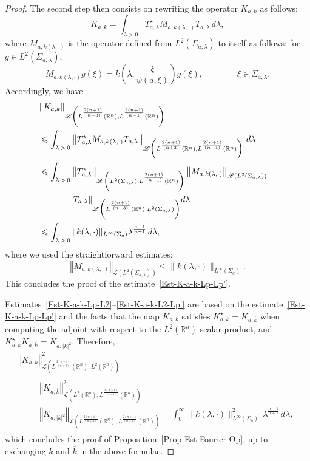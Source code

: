 \documentclass[10pt]{amsart}
\theoremstyle{definition}\newtheorem{defi}[theo]{Definition}\newtheorem{rema}[theo]{Remark}\newtheorem{exam}[theo]{Example}\newtheorem{exem}[theo]{Example}\newtheorem{nota}[theo]{Notation}
\newcommand{\scL}{\mathscr{L}}
\newcommand*\R{\mathbb{R}}
\newcommand{\norm}[1]{\left\Vert#1\right\Vert}
\renewcommand{\leq}{\leqslant}
\begin{document}
\begin{proof}
The second step then consists on rewriting the operator $K_{a,k}$ as follows:
\[
K_{a,k} = \int_{\lambda >0} T_{a,\lambda}^\star M_{a,k(\lambda, \cdot)} T_{a, \lambda} \, d\lambda,
\]
where $M_{a, k(\lambda, \cdot)}$ is the operator defined from $ L^2(\Sigma_{a, \lambda})$ to itself as follows: for $g \in L^2(\Sigma_{a,\lambda})$,
\[
M_{a, k(\lambda, \cdot)} g (\xi) = k\left(\lambda, \frac{\xi}{\psi(a, \xi)} \right) g(\xi), \qquad \qquad \xi \in \Sigma_{a,\lambda}.
\]
Accordingly, we have
\begingroup
\allowdisplaybreaks
\begin{align*}
\lefteqn{\norm{K_{a,k} }_{\scL\left(L^{\frac{2(n+1)}{(n+3)}}(\R^n),L^{\frac{2(n+1)}{(n-1)}}(\R^n)\right)} }
\\
& \leq
\int_{\lambda\, >\,0}
\norm{T_{a,\lambda}^\star M_{a,k(\lambda, \cdot)} T_{a, \lambda} }_{\scL\left(L^{\frac{2(n+1)}{(n+3)}}(\R^n),L^{\frac{2(n+1)}{(n-1)}}(\R^n)\right)}
\, d\lambda
\\
&\leq \int_{\lambda\, >\,0}
\norm{T_{a,\lambda}^\star}_{\scL\left(L^{2}(\Sigma_{a,\lambda}),L^{\frac{2(n+1)}{(n-1)}}(\R^n)\right)}
\norm{M_{a,k(\lambda, \cdot)} }_{\scL\left(L^{2}(\Sigma_{a,\lambda})\right)}\\
&\mkern60mu
\norm{T_{a, \lambda} }_{\scL\left(L^{\frac{2(n+1)}{(n+3)}}(\R^n),L^{2}(\Sigma_{a,\lambda})\right)}
\! d\lambda
\\
& \leq \int_{\lambda\,>\,0} \| k (\lambda, \cdot)\|_{L^\infty(\Sigma_a)} \lambda^{\frac{n-1}{n+1}} \, d\lambda,
\end{align*}
\endgroup
where we used the straightforward estimates:
\[
\norm{M_{a,k(\lambda, \cdot)} }_{\scL\left(L^{2}(\Sigma_{a,\lambda})\right)}
\leq
\| k(\lambda, \cdot) \|_{L^\infty(\Sigma_a)}.
\]
This concludes the proof of the estimate~\eqref{Est-K-a-k-Lp-Lp'}.

Estimates~\eqref{Est-K-a-k-Lp-L2}--\eqref{Est-K-a-k-L2-Lp'} are based on the estimate~\eqref{Est-K-a-k-Lp-Lp'} and the facts that the map $K_{a,k}$ satisfies $K_{a,k}^\star = K_{a,\overline{k}}$ when computing the adjoint with respect to the $L^2(\R^n)$ scalar product, and $K_{a,k}^\star K_{a,\overline k} = K_{a,|k|^2}$. Therefore,
\begin{multline*}
\norm{K_{a,k} }_{\scL\left(L^{\frac{2(n+1)}{(n+3)}}(\R^n),L^{2}(\R^n)\right)}^2\\
\begin{aligned}
&=
\norm{K_{a,\overline k} }_{\scL\left(L^{2}(\R^n),L^{\frac{2(n+1)}{(n-1)}}(\R^n)\right)}^2
\\
&=
\norm{K_{a,|k|^2} }_{\scL\left(L^{\frac{2(n+1)}{(n+3)}}(\R^n),L^{\frac{2(n+1)}{(n-1)}}(\R^n)\right)} =
\int_0^\infty \| k(\lambda, \cdot)\|_{L^\infty(\Sigma_a)}^2 \, \lambda^{\frac{n-1}{n+1}} \, d\lambda,
\end{aligned}
\end{multline*}
which concludes the proof of Proposition~\ref{Prop-Est-Fourier-Op}, up to exchanging $k$ and $\overline k$ in the above formulae.
\end{proof}
\end{document}
